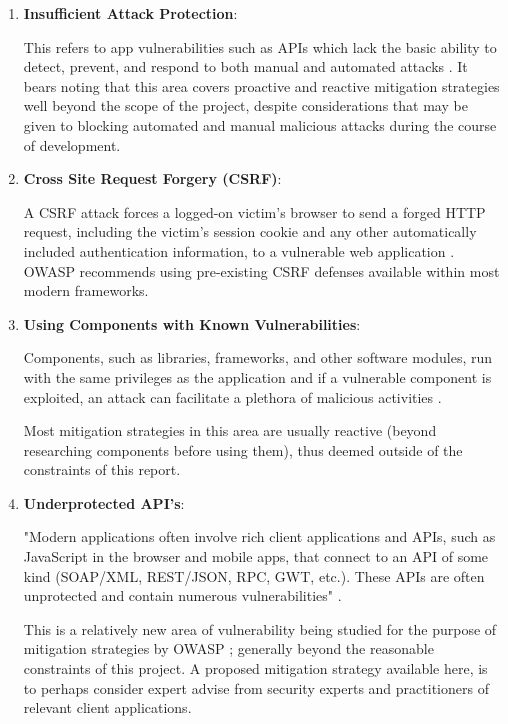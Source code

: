\begin{enumerate}
    \item \textbf{Insufficient Attack Protection}:
    
    This refers to app vulnerabilities such as APIs which lack the basic ability to detect, prevent, and respond to both manual and automated attacks \cite{OWASP2017}. It bears noting that this area covers proactive and reactive mitigation strategies well beyond the scope of the project, despite considerations that may be given to blocking automated and manual malicious attacks during the course of development.
    
    \item \textbf{Cross Site Request Forgery (CSRF)}:
    
    A CSRF attack forces a logged-on victim's browser to send a forged HTTP request, including the victim’s session cookie and any other automatically included authentication information, to a vulnerable web application \cite{OWASP2017}. OWASP recommends using pre-existing CSRF defenses available within most modern frameworks.
    
    \item \textbf{Using Components with Known Vulnerabilities}:
    
    Components, such as libraries, frameworks, and other software modules, run with the same privileges as the application and if a vulnerable component is exploited,  an attack can facilitate  a plethora of malicious activities \cite{OWASP2017}.
    
    Most mitigation strategies in this area are usually reactive (beyond researching components before using them), thus deemed outside of the constraints of this report.
    
    \item \textbf{Underprotected API's}:
    
    "Modern applications often involve rich client applications and APIs, such as JavaScript in the browser and mobile apps, that connect to an API of some kind (SOAP/XML, REST/JSON, RPC, GWT, etc.). These APIs are often unprotected and contain numerous vulnerabilities" \cite{OWASP2017}.
    
    This is a relatively new area of vulnerability being studied for the purpose of mitigation strategies by OWASP \cite{OWASP2017}; generally beyond the reasonable constraints of this project. A proposed mitigation strategy available here, is to perhaps consider expert advise from security experts and practitioners of relevant client applications.
    
\end{enumerate}




